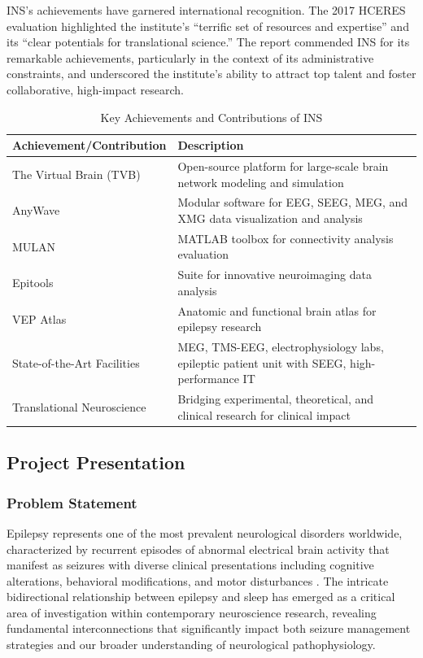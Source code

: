 \documentclass[a4paper,12pt,twoside]{article}
\begin{document}
INS’s achievements have garnered international recognition. The 2017 HCERES evaluation highlighted the institute’s ``terrific set of resources and expertise'' and its ``clear potentials for translational science.'' The report commended INS for its remarkable achievements, particularly in the context of its administrative constraints, and underscored the institute’s ability to attract top talent and foster collaborative, high-impact research.



\begin{table}[H]
\centering
\begin{tabularx}{\textwidth}{lX}
\toprule
\textbf{Achievement/Contribution} & \textbf{Description} \\
\midrule
The Virtual Brain (TVB) & Open-source platform for large-scale brain network modeling and simulation \\
AnyWave & Modular software for EEG, SEEG, MEG, and XMG data visualization and analysis \\
MULAN & MATLAB toolbox for connectivity analysis evaluation \\
Epitools & Suite for innovative neuroimaging data analysis \\
VEP Atlas & Anatomic and functional brain atlas for epilepsy research \\
State-of-the-Art Facilities & MEG, TMS-EEG, electrophysiology labs, epileptic patient unit with SEEG, high-performance IT \\
Translational Neuroscience & Bridging experimental, theoretical, and clinical research for clinical impact \\
\bottomrule
\end{tabularx}
\caption{Key Achievements and Contributions of INS}
\end{table}


\subsection{Project Presentation}

\subsubsection{Problem Statement}

Epilepsy represents one of the most prevalent neurological disorders worldwide, characterized by recurrent episodes of abnormal electrical brain activity that manifest as seizures with diverse clinical presentations including cognitive alterations, behavioral modifications, and motor disturbances \cite{murphy2009sleep}. The intricate bidirectional relationship between epilepsy and sleep has emerged as a critical area of investigation within contemporary neuroscience research, revealing fundamental interconnections that significantly impact both seizure management strategies and our broader understanding of neurological pathophysiology.
\end{document}
